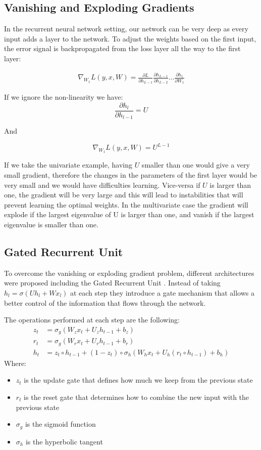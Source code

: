 \documentclass[11pt,oneside,openright]{report}
\begin{document}
\subsection{Vanishing and Exploding Gradients}
In the recurrent neural network setting, our network can be very deep as every input adds a layer to the network. To adjust the weights based on the first input, the error signal is backpropagated from the loss layer all the way to the first layer: 

 \begin{align}
   \nabla_{W_1} L(y, x, W) = \frac{\partial L}{\partial h_{L-1}} \frac{\partial h_{L-1}}{\partial h_{L-2}} ... \frac{\partial h_1}{\partial W_1}
 \end{align}
 
 If we ignore the non-linearity we have:
 $$ \frac{\partial h_{l}}{\partial h_{l-1}} = U $$
 
 And 
 
 $$ \nabla_{W_1} L(y, x, W) = U^{L-1}$$
 
 If we take the univariate example, having $U$ smaller than one would give a very small gradient, therefore the changes in the parameters of the first layer would be very small and we would have difficulties learning. Vice-versa if $U$ is larger than one, the gradient will be very large and this will lead to instabilities that will prevent learning the optimal weights. In the multivariate case the gradient will explode if the largest eigenvalue of U is larger than one, and vanish if the largest eigenvalue is smaller than one.

\subsection{Gated Recurrent Unit}
To overcome the vanishing or exploding gradient problem, different architectures were proposed including the Gated Recurrent Unit \cite{gru}. Instead of taking $h_l = \sigma(U h_l + W x_l)$ at each step they introduce a gate mechanism that allows a better control of the information that flows through the network.

The operations performed at each step are the following:
\begin{align}
z_t &= \sigma_g(W_{z} x_t + U_{z} h_{t-1} + b_z) \\
r_t &= \sigma_g(W_{r} x_t + U_{r} h_{t-1} + b_r) \\
h_t &=  z_t \circ h_{t-1} + (1-z_t) \circ \sigma_h(W_{h} x_t + U_{h} (r_t \circ h_{t-1}) + b_h)
\end{align}
Where:
\begin{itemize}
 \item $z_t$ is the update gate that defines how much we keep from the previous state
 \item $r_t$ is the reset gate that determines how to combine the new input with the previous state
\item  $\sigma_g$ is the sigmoid function
\item $\sigma_h$ is the hyperbolic tangent
\end{itemize}
\end{document}
